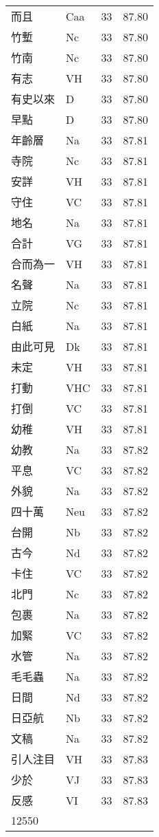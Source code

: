 \documentclass[twocolumn]{book}
\begin{document}
\begin{supertabular}{llrr}
而且 & Caa & 33 &  87.80\\
竹塹 & Nc & 33 &  87.80\\
竹南 & Nc & 33 &  87.80\\
有志 & VH & 33 &  87.80\\
有史以來 & D & 33 &  87.80\\
早點 & D & 33 &  87.80\\
年齡層 & Na & 33 &  87.81\\
寺院 & Nc & 33 &  87.81\\
安詳 & VH & 33 &  87.81\\
守住 & VC & 33 &  87.81\\
地名 & Na & 33 &  87.81\\
合計 & VG & 33 &  87.81\\
合而為一 & VH & 33 &  87.81\\
名聲 & Na & 33 &  87.81\\
立院 & Nc & 33 &  87.81\\
白紙 & Na & 33 &  87.81\\
由此可見 & Dk & 33 &  87.81\\
未定 & VH & 33 &  87.81\\
打動 & VHC & 33 &  87.81\\
打倒 & VC & 33 &  87.81\\
幼稚 & VH & 33 &  87.81\\
幼教 & Na & 33 &  87.82\\
平息 & VC & 33 &  87.82\\
外貌 & Na & 33 &  87.82\\
四十萬 & Neu & 33 &  87.82\\
台開 & Nb & 33 &  87.82\\
古今 & Nd & 33 &  87.82\\
卡住 & VC & 33 &  87.82\\
北門 & Nc & 33 &  87.82\\
包裹 & Na & 33 &  87.82\\
加緊 & VC & 33 &  87.82\\
水管 & Na & 33 &  87.82\\
毛毛蟲 & Na & 33 &  87.82\\
日間 & Nd & 33 &  87.82\\
日亞航 & Nb & 33 &  87.82\\
文稿 & Na & 33 &  87.82\\
引人注目 & VH & 33 &  87.83\\
少於 & VJ & 33 &  87.83\\
反感 & VI & 33 &  87.83\\
12550\\

\end{supertabular}
\end{document}
